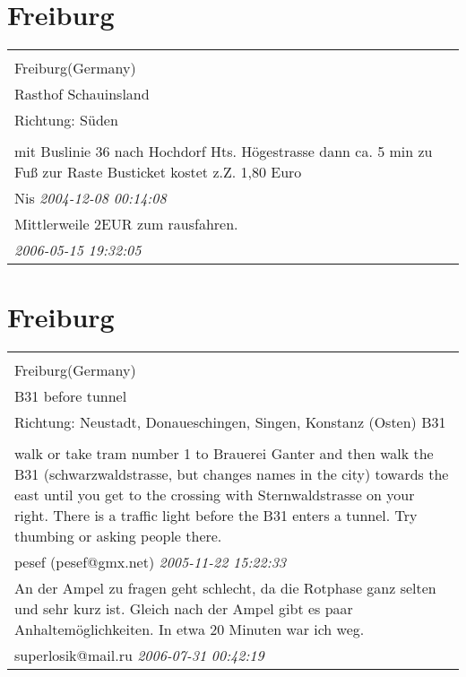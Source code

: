 \documentclass[a4paper,12pt]{article}
\begin{document}
\section{Freiburg}
\begin{tabular}{|p{13cm}|}
\hline\\
Freiburg(Germany)\\
Rasthof Schauinsland\\
Richtung: Süden \\
\hline\\
mit Buslinie 36 nach Hochdorf Hts. Högestrasse dann ca. 5 min zu Fuß zur Raste Busticket kostet z.Z. 1,80 Euro \\
Nis \textit{ 2004-12-08 00:14:08 }\\\hline Mittlerweile 2EUR zum rausfahren. \\
\textit{ 2006-05-15 19:32:05 }\\\hline
\end{tabular}


\section{Freiburg}
\begin{tabular}{|p{13cm}|}
\hline\\
Freiburg(Germany)\\
B31 before tunnel\\
Richtung: Neustadt, Donaueschingen, Singen, Konstanz (Osten) B31 \\
\hline\\
walk or take tram number 1 to Brauerei Ganter and then walk the B31 (schwarzwaldstrasse, but changes names in the city) towards the east until you get to the crossing with Sternwaldstrasse on your right. There is a traffic light before the B31 enters a tunnel. Try thumbing or asking people there. \\
pesef (pesef@gmx.net) \textit{ 2005-11-22 15:22:33 }\\\hline An der Ampel zu fragen geht schlecht, da die Rotphase ganz selten und sehr kurz ist. Gleich nach der Ampel gibt es paar Anhaltemöglichkeiten. In etwa 20 Minuten war ich weg. \\
superlosik@mail.ru \textit{ 2006-07-31 00:42:19 }\\\hline
\end{tabular}
\end{document}
